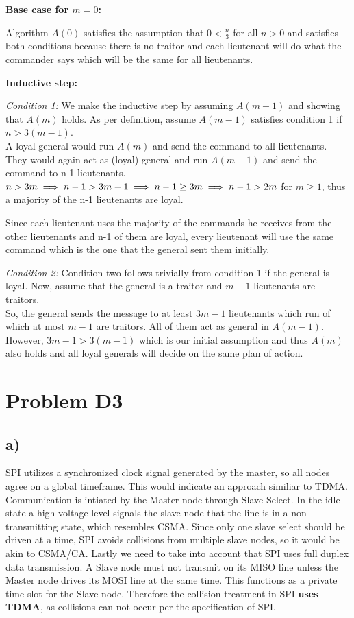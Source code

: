 \documentclass[12pt]{article}
\begin{document}
\textbf{Base case for $m=0$:} 

Algorithm $A(0)$ satisfies the assumption that $0 < \frac{n}{3}$ for all $n>0$ and satisfies both conditions because there is no traitor and each lieutenant will do what the commander says which will be the same for all lieutenants.

\textbf{Inductive step:}

\textit{Condition 1:} We make the inductive step by assuming $A(m-1)$ and showing that $A(m)$ holds. As per definition, assume $A(m-1)$ satisfies condition 1 if $n > 3(m-1)$.\\
A loyal general would run $A(m)$ and send the command to all lieutenants.\\
They would again act as (loyal) general and run $A(m-1)$ and send the command to n-1 lieutenants.\\
$n>3m\\
\implies n-1>3m-1 \\
\implies n-1\geq3m \\
\implies n-1>2m$ for $m\geq1$, thus a majority of the n-1 lieutenants are loyal.

Since each lieutenant uses the majority of the commands he receives from the other lieutenants and n-1 of them are loyal, every lieutenant will use the same command which is the one that the general sent them initially.

\textit{Condition 2:} Condition two follows trivially from condition 1 if the general is loyal. Now, assume that the general is a traitor and $m-1$ lieutenants are traitors. \\
So, the general sends the message to at least $3m-1$ lieutenants which run of which at most $m-1$ are traitors. All of them act as general in $A(m-1)$. However, $3m-1 > 3(m-1)$ which is our initial assumption and thus $A(m)$ also holds and all loyal generals will decide on the same plan of action.

\section*{Problem D3}
\subsection*{a)}
SPI utilizes a synchronized clock signal generated by the master, so all nodes agree on a global timeframe. This would indicate an approach similiar to TDMA. Communication is intiated by the Master node through Slave Select. In the idle state a high voltage level signals the slave node that the line is in a non-transmitting state, which resembles CSMA. Since only one slave select should be driven at a time, SPI avoids collisions from multiple slave nodes, so it would be akin to CSMA/CA. 
Lastly we need to take into account that SPI uses full duplex data transmission. A Slave node must not transmit on its MISO line unless the Master node drives its MOSI line at the same time. This functions as a private time slot for the Slave node.
Therefore the collision treatment in SPI \textbf{uses TDMA}, as collisions can not occur per the specification of SPI.
\end{document}
